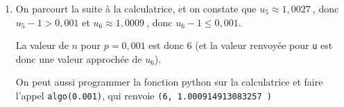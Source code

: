\documentclass[10pt]{article}
\providecommand{\np}[2][]{{#2~#1}}
\begin{document}
\begin{enumerate}
\begin{enumerate}
Puis, à chaque exécution de la boucle \texttt{while},  \texttt{u} se voit affecter le terme suivant dans la suite $(u_n)$ et \texttt{n} se voit affecter l'entier suivant, donc l'indice correspondant au terme dont la valeur est stockée dans la variable \texttt{u}.

Cette boucle \texttt{while} tourne tant que l'écart entre le terme stocké dans la variable \texttt{u} et la limite 1 est strictement supérieur à la valeur \texttt{p}, qui est l'argument choisi pour invoquer la fonction.

Les valeurs \texttt{n} et \texttt{u} renvoyées par l'appel de la fonction \texttt{algo(p)} correspondent donc respectivement à l'indice et à la valeur du premier terme de la suite pour lequel l'écart entre le terme et la limite de la suite est inférieur ou égal à la valeur \texttt{p} choisie.

		\item On parcourt la suite à la calculatrice, et on constate que $u_5 \approx \np{1,0027}$, donc $u_5 - 1 > 0,001$ et $u_6 \approx \np{1,0009}$, donc $u_6 - 1 \leqslant 0,001$.

La valeur de $n$ pour $p=0,001$ est donc 6 (et la valeur renvoyée pour \texttt{u} est donc une valeur approchée de $u_6$).

On peut aussi programmer la fonction python sur la calculatrice et faire l'appel \texttt{algo(0.001)}, qui renvoie \texttt{(6, \np{1.000914913083257})}
	\end{enumerate}
\end{enumerate}

\bigskip
\end{document}
